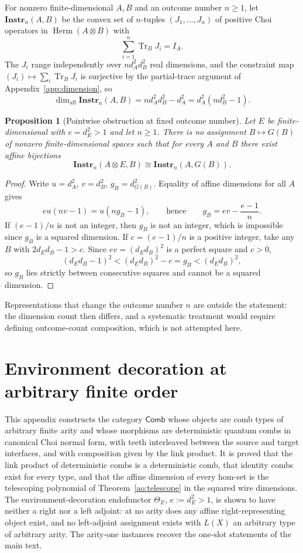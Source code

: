 \documentclass[11pt,a4paper]{article}
\theoremstyle{definition}
\theoremstyle{plain}
\newtheorem{proposition}[theorem]{Proposition}
\theoremstyle{remark}
\DeclareMathOperator{\Tr}{Tr}
\DeclareMathOperator{\Herm}{Herm}
\newcommand{\Comb}{\mathsf{Comb}}
\newcommand{\affdim}{\dim_{\mathrm{aff}}}
\begin{document}
For nonzero finite-dimensional $A,B$ and an outcome number $n\geq1$, let
$\mathbf{Instr}_n(A,B)$ be the convex set of $n$-tuples
$(J_1,\dots,J_n)$ of positive Choi operators in $\Herm(A\otimes B)$
with
\[
\sum_{i=1}^n\Tr_BJ_i=I_A.
\]
The $J_i$ range independently over $n d_A^2d_B^2$ real dimensions, and
the constraint map $(J_i)\mapsto\sum_i\Tr_BJ_i$ is surjective by the
partial-trace argument of Appendix~\ref{app:dimension}, so
\[
\affdim\mathbf{Instr}_n(A,B)=nd_A^2d_B^2-d_A^2=d_A^2(nd_B^2-1).
\]

\begin{proposition}[Pointwise obstruction at fixed outcome number]
Let $E$ be finite-dimensional with $e=d_E^2>1$ and let $n\geq1$.
There is no assignment $B\mapsto G(B)$ of nonzero finite-dimensional
spaces such that for every $A$ and $B$ there exist affine bijections
\[
\mathbf{Instr}_n(A\otimes E,B)\cong\mathbf{Instr}_n(A,G(B)).
\]
\end{proposition}
\begin{proof}
Write $u=d_A^2$, $v=d_B^2$, $g_B=d_{G(B)}^2$. Equality of affine
dimensions for all $A$ gives
\[
eu(nv-1)=u(ng_B-1),
\qquad\text{hence}\qquad
g_B=ev-\frac{e-1}{n}.
\]
If $(e-1)/n$ is not an integer, then $g_B$ is not an integer, which is
impossible since $g_B$ is a squared dimension. If $c=(e-1)/n$ is a
positive integer, take any $B$ with $2d_Ed_B-1>c$. Since
$ev=(d_Ed_B)^2$ is a perfect square and $c>0$,
\[
(d_Ed_B-1)^2<(d_Ed_B)^2-c=g_B<(d_Ed_B)^2,
\]
so $g_B$ lies strictly between consecutive squares and cannot be a
squared dimension.
\end{proof}

Representations that change the outcome number $n$ are outside the
statement: the dimension count then differs, and a systematic treatment
would require defining outcome-count composition, which is not attempted
here.

\section{Environment decoration at arbitrary finite order}
\label{app:allorders}

This appendix constructs the category $\Comb$ whose objects are comb
types of arbitrary finite arity and whose morphisms are deterministic
quantum combs in canonical Choi normal form, with teeth interleaved
between the source and target interfaces, and with composition given by
the link product. It is proved that the link product of deterministic
combs is a deterministic comb, that identity combs exist for every
type, and that the affine dimension of every hom-set is the telescoping
polynomial of Theorem~\ref{ao:telescope} in the squared wire
dimensions. The environment-decoration endofunctor $\Theta_E$,
$e:=d_E^2>1$, is shown to have neither a right nor a left adjoint: at
no arity does any affine right-representing object exist, and no
left-adjoint assignment exists with $L(X)$ an arbitrary type of
arbitrary arity. The arity-one instances recover the one-slot
statements of the main text.
\end{document}
